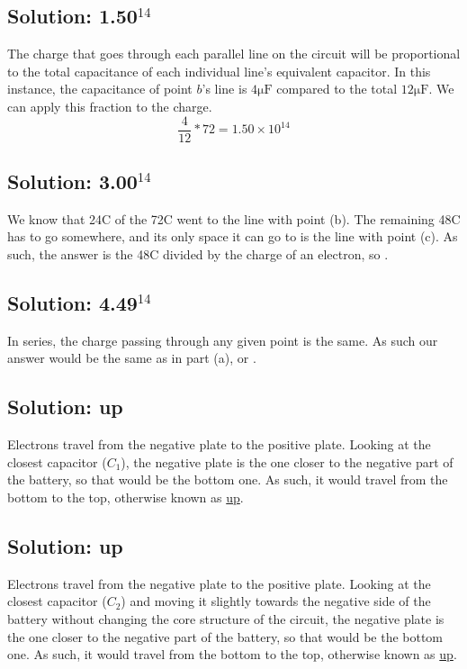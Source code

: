 \documentclass[12pt]{article}
\begin{document}
\subsection{Solution: 1.50$^{14}$}
The charge that goes through each parallel line on the circuit will be proportional to the total capacitance of each individual line's equivalent capacitor.
In this instance, the capacitance of point $b$'s line is $4\unit{\micro\farad}$ compared to the total $12\unit{\micro\farad}$. 
We can apply this fraction to the charge. 
\[\frac{4}{12}*72 = \boxed{1.50 \times 10^{14}}\]

\subsection{Solution: 3.00$^{14}$}
We know that 24\textmu C of the 72\textmu C went to the line with point (b).
The remaining 48\textmu C has to go somewhere, and its only space it can go to is the line with point (c).
As such, the answer is the 48\textmu C divided by the charge of an electron, so .

\subsection{Solution: 4.49$^{14}$}
In series, the charge passing through any given point is the same. 
As such our answer would be the same as in part (a), or .

\subsection{Solution: up}
Electrons travel from the negative plate to the positive plate. 
Looking at the closest capacitor ($C_1$), the negative plate is the one closer to the negative part of the battery, so that would be the bottom one.
As such, it would travel from the bottom to the top, otherwise known as \underline{up}.

\subsection{Solution: up}
Electrons travel from the negative plate to the positive plate. 
Looking at the closest capacitor ($C_2$) and moving it slightly towards the negative side of the battery without changing the core structure of the circuit, the negative plate is the one closer to the negative part of the battery, so that would be the bottom one.
As such, it would travel from the bottom to the top, otherwise known as \underline{up}.
\end{document}
